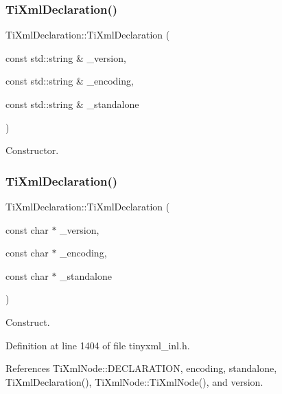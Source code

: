 \subsubsection{\texorpdfstring{Ti\+Xml\+Declaration()}{TiXmlDeclaration()}\hspace{0.1cm}{\footnotesize\ttfamily [2/4]}}
{\footnotesize\ttfamily Ti\+Xml\+Declaration\+::\+Ti\+Xml\+Declaration (\begin{DoxyParamCaption}\item[{const std\+::string \&}]{\+\_\+version,  }\item[{const std\+::string \&}]{\+\_\+encoding,  }\item[{const std\+::string \&}]{\+\_\+standalone }\end{DoxyParamCaption})}



Constructor. 

\hypertarget{class_ti_xml_declaration_a3b618d1c30c25e4b7a71f31a595ee298}{}\label{class_ti_xml_declaration_a3b618d1c30c25e4b7a71f31a595ee298} 
\subsubsection{\texorpdfstring{Ti\+Xml\+Declaration()}{TiXmlDeclaration()}\hspace{0.1cm}{\footnotesize\ttfamily [3/4]}}
{\footnotesize\ttfamily Ti\+Xml\+Declaration\+::\+Ti\+Xml\+Declaration (\begin{DoxyParamCaption}\item[{const char $\ast$}]{\+\_\+version,  }\item[{const char $\ast$}]{\+\_\+encoding,  }\item[{const char $\ast$}]{\+\_\+standalone }\end{DoxyParamCaption})}



Construct. 



Definition at line 1404 of file tinyxml\+\_\+inl.\+h.



References Ti\+Xml\+Node\+::\+D\+E\+C\+L\+A\+R\+A\+T\+I\+ON, encoding, standalone, Ti\+Xml\+Declaration(), Ti\+Xml\+Node\+::\+Ti\+Xml\+Node(), and version.

\hypertarget{class_ti_xml_declaration_a58ac9042c342f7845c8491da0bb091e8}{}\label{class_ti_xml_declaration_a58ac9042c342f7845c8491da0bb091e8} 
